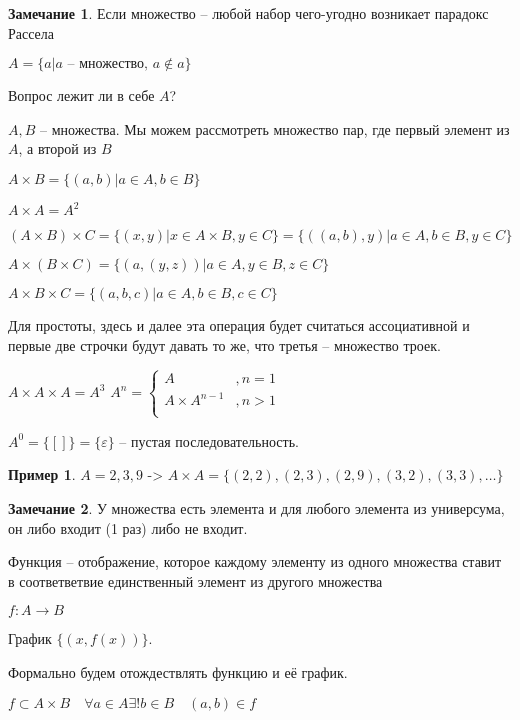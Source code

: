 \documentclass{book}
\theoremstyle{definition}
\newtheorem*{note}{Замечание}
\newtheorem*{example}{Пример}
\begin{document}
        \begin{note}
            Если множество -- любой набор чего-угодно возникает парадокс Рассела

            $A = \{a|a\text{ -- множество, } a\not\in a\}$
            
            Вопрос лежит ли в себе $A$? 
        \end{note}

        \begin{definition}
            [Пара]

            $A, B$ -- множества. Мы можем рассмотреть множество пар, где первый элемент из $A$, а второй из $B$

            $A \times B = \{(a,b) | a\in A, b\in B\}$

            $A\times A = A^2$
        \end{definition}

        $(A\times B)\times C = \{(x,y)|x\in A\times B, y\in C\} = \{((a,b),y) |a\in A, b\in B, y\in C\}$ 
   
        $A\times (B\times C) = \{(a,(y,z))| a\in A, y\in B, z\in C\}$
        
        $A\times B\times C = \{(a,b,c)|a\in A, b\in B, c\in C\}$

        Для простоты, здесь и далее эта операция будет считаться ассоциативной и первые две строчки будут давать то же, что третья -- множество троек.

        $A\times A\times A = A^3$
        $A^n = \begin{cases}
            A&,n=1\\
            A\times A^{n-1}&,n>1\\
        \end{cases}$

        $A^0 = \{[]\} = \{\varepsilon\}$ -- пустая последовательность.         
        \begin{example}
            $A = {2, 3, 9}$
->    
            $A\times A =\{(2,2),(2,3),(2,9),(3,2),(3,3),\ldots\}$ 
        \end{example}

        \begin{note}
            У множества есть элемента и для любого элемента из универсума, он либо входит (1 раз) либо не входит.
        \end{note}

        \begin{definition}
            Функция -- отображение, которое каждому элементу из одного множества ставит в соответветвие единственный элемент из другого множества

            $f:A\to B$ 

            График $\{(x,f(x))\}$.

            Формально будем отождествлять функцию и её график.

            $f\subset A\times B\quad \forall a\in A \exists ! b\in B\quad (a,b)\in f$
        \end{definition}
\end{document}
